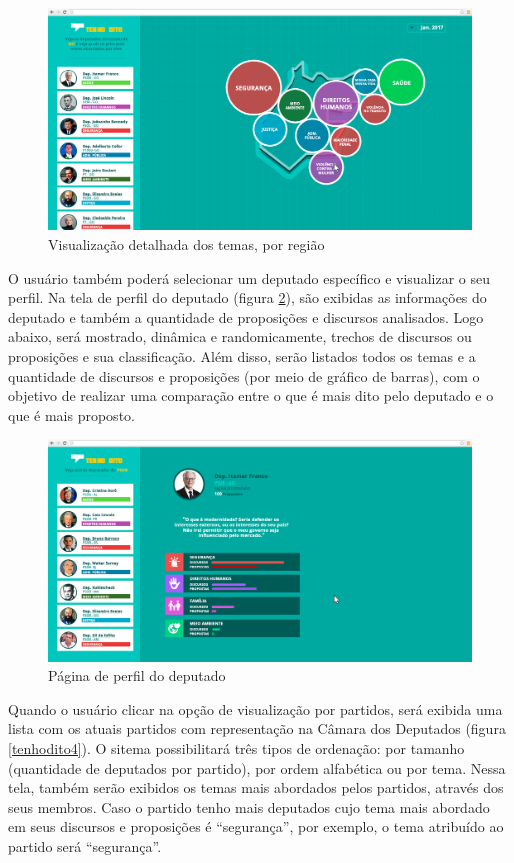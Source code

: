 \begin{apendicesenv}
\begin{figure}[h]
  \centering
  \includegraphics[scale=0.2]{figuras/tenhodito2.eps}
  \caption{Visualização detalhada dos temas, por região}
  \label{tenhodito2}
\end{figure}

O usuário também poderá selecionar um deputado específico e visualizar o seu perfil. Na tela de perfil do deputado (figura \ref{tenhodito3}), são exibidas as informações do deputado e também a quantidade de proposições e discursos analisados. Logo abaixo, será mostrado, dinâmica e randomicamente, trechos de discursos ou proposições e sua classificação. Além disso, serão listados todos os temas e a quantidade de discursos e proposições (por meio de gráfico de barras), com o objetivo de realizar uma comparação entre o que é mais dito pelo deputado e o que é mais proposto.

\begin{figure}[h]
  \centering
  \includegraphics[scale=0.2]{figuras/tenhodito3.eps}
  \caption{Página de perfil do deputado}
  \label{tenhodito3}
\end{figure}

Quando o usuário clicar na opção de visualização por partidos, será exibida uma lista com os atuais partidos com representação na Câmara dos Deputados (figura \ref{tenhodito4}). O sitema possibilitará três tipos de ordenação: por tamanho (quantidade de deputados por partido), por ordem alfabética ou por tema. Nessa tela, também serão exibidos os temas mais abordados pelos partidos, através dos seus membros. Caso o partido tenho mais deputados cujo tema mais abordado em seus discursos e proposições é ``segurança'', por exemplo, o tema atribuído ao partido será ``segurança''.


\end{apendicesenv}
